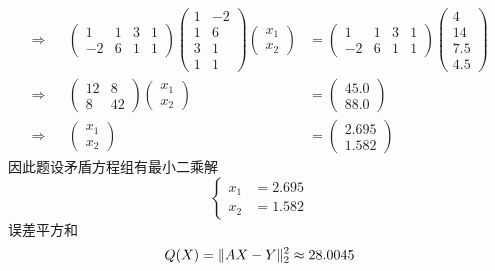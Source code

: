 \documentclass[11pt]{article}
\begin{document}
\begin{question}
{\begin{align*}
			\Rightarrow &   & \begin{pmatrix}
				1  & 1 & 3 & 1 \\
				-2 & 6 & 1 & 1
			\end{pmatrix}
			\begin{pmatrix}
				1 & -2 \\
				1 & 6  \\
				3 & 1  \\
				1 & 1
			\end{pmatrix}
			\begin{pmatrix}
				x_1 \\
				x_2
			\end{pmatrix}
			            & =
			\begin{pmatrix}
				1  & 1 & 3 & 1 \\
				-2 & 6 & 1 & 1
			\end{pmatrix}
			\begin{pmatrix}
				4   \\
				14  \\
				7.5 \\
				4.5
			\end{pmatrix}                                     \\
			\Rightarrow &   & \begin{pmatrix}
				12 & 8  \\
				8  & 42
			\end{pmatrix}
			\begin{pmatrix}
				x_1 \\
				x_2
			\end{pmatrix}
			            & =
			\begin{pmatrix}
				45.0 \\
				88.0
			\end{pmatrix}                                     \\
			\Rightarrow &   & \begin{pmatrix}
				x_1 \\
				x_2
			\end{pmatrix}
			            & =
			\begin{pmatrix}
				2.695 \\
				1.582
			\end{pmatrix}
		\end{align*}
		因此题设矛盾方程组有最小二乘解
		\begin{equation*}
			\left\{
			\begin{aligned}
				x_1 & = 2.695 \\
				x_2 & = 1.582
			\end{aligned}
			\right.
		\end{equation*}
		误差平方和
		\begin{equation*}
			Q(X) = \Arrowvert AX - Y \Arrowvert^2_2 \approx 28.0045
		\end{equation*}
	}
\end{question}
\end{document}
